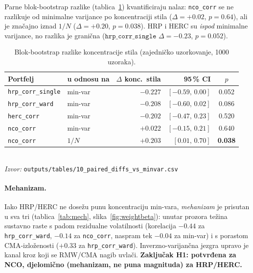 \documentclass[11pt]{article}
\newcommand{\izvor}[1]{{\footnotesize\textit{Izvor:} \texttt{#1}}}
\begin{document}
Parne blok-bootstrap razlike (tablica~\ref{tab:h1diff}) kvantificiraju nalaz:
\texttt{nco\_corr} se ne razlikuje od minimalne varijance po koncentraciji stila
($\Delta=+0.02$, $p=0.64$), ali je značajno iznad $1/N$ ($\Delta=+0.20$,
$p=0.038$). HRP i HERC su \emph{ispod} minimalne varijance, no razlika je
granična ($\texttt{hrp\_corr\_single}$ $\Delta=-0.23$, $p=0.052$).

\begin{table}[!htbp]
  \centering
  \caption{Blok-bootstrap razlike koncentracije stila (zajedničko uzorkovanje,
  1000 uzoraka).}
  \label{tab:h1diff}
  \small
  \begin{tabular}{llrrc}
    \toprule
    Portfelj & u odnosu na & $\Delta$ konc.\ stila & 95\,\% CI & $p$ \\
    \midrule
    \texttt{hrp\_corr\_single} & min-var       & $-0.227$ & $[-0.59,\,0.00]$ & 0.052 \\
    \texttt{hrp\_corr\_ward}   & min-var       & $-0.208$ & $[-0.60,\,0.02]$ & 0.086 \\
    \texttt{herc\_corr}        & min-var       & $-0.202$ & $[-0.47,\,0.23]$ & 0.520 \\
    \texttt{nco\_corr}         & min-var       & $+0.022$ & $[-0.15,\,0.21]$ & 0.640 \\
    \texttt{nco\_corr}         & $1/N$         & $\mathbf{+0.203}$ & $[0.01,\,0.70]$ & \textbf{0.038} \\
    \bottomrule
  \end{tabular}\\[0.3em]
  \izvor{outputs/tables/10\_paired\_diffs\_vs\_minvar.csv}
\end{table}

\paragraph{Mehanizam.} Iako HRP/HERC ne dosežu punu koncentraciju min-vara,
\emph{mehanizam} je prisutan u sva tri (tablica~\ref{tab:mech},
slika~\ref{fig:weightbeta}): unutar prozora težina sustavno raste s padom
rezidualne volatilnosti (korelacija $-0.44$ za \texttt{hrp\_corr\_ward}, $-0.14$
za \texttt{nco\_corr}, naspram tek $-0.04$ za min-var) i s porastom
CMA-izloženosti ($+0.33$ za \texttt{hrp\_corr\_ward}). Inverzno-varijančna jezgra
upravo je kanal kroz koji se RMW/CMA nagib uvlači. \textbf{Zaključak H1:
potvrđena za NCO, djelomično (mehanizam, ne puna magnituda) za HRP/HERC.}
\end{document}
